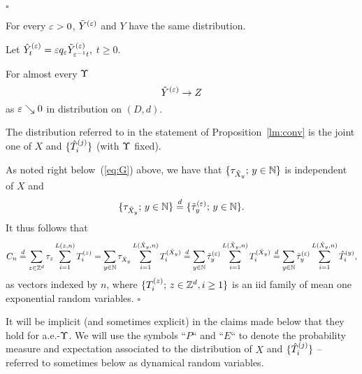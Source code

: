 $\square$

\begin{prop}
\label{prop:version}
For every $\varepsilon>0$, $\tilde Y^{(\varepsilon)}$ and $Y$ have the same distribution.
\end{prop}

Let $\hat Y^{(\varepsilon)}_t=\varepsilon q_\varepsilon\tilde Y^{(\varepsilon)}_{\varepsilon^{-1}t},$ $t\geq0$.

\begin{prop}
\label{lm:conv}
For almost every $\Upsilon$
\begin{equation}
\label{eq:conve}
\hat Y^{(\eps)}\to Z
\end{equation}
as $\varepsilon\searrow0$ in distribution on $(D,d)$.
\end{prop}


\begin{rmk}
 \label{rmk:aeups}
The distribution referred to in the statement of Proposition~\ref{lm:conv} is the joint one of $X$ and $\{\hat T^{(j)}_i\}$ (with $\Upsilon$ fixed).
\end{rmk}




As noted right below~(\ref{eq:G}) above, we have that $\{\tau_{\hat X_y};\,y\in{\mathbb N}\}$ is independent of $X$ and
\begin{equation}
\label{eq:seq}
\{\tau_{\hat X_y};\,y\in\N\}\stackrel{d}=\{\tilde\tau^{(\eps)}_{y};\,y\in\N\}.
\end{equation}
It thus follows that
\begin{equation}
\label{eq:clock1}
C_n\stackrel{d}=\sum_{z\in\Z^d}\tau_{z}\sum_{i=1}^{L(z,n)} T^{(z)}_i
=\sum_{y\in\N}\tau_{\hat X_y}\sum_{i=1}^{L(\hat X_y,n)} T^{(\hat X_y)}_i
\stackrel{d}=\sum_{y\in\N}\tilde\tau^{(\eps)}_{y}\sum_{i=1}^{L(\hat X_y,n)} T^{(\hat X_y)}_i
\stackrel{d}=\sum_{y\in\N}\tilde\tau^{(\eps)}_{y}\sum_{i=1}^{L(\hat X_y,n)}\hat T^{(y)}_i,
\end{equation}
as vectors indexed by $n$, where $\{T^{(z)}_i;\,z\in{\mathbb Z}^d, i\geq1\}$ is an iid family of mean one 
exponential random variables.
$\square$

\bigskip







It will be implicit (and sometimes explicit) in the claims made below that they hold for a.e.-$\Upsilon$.
We will use the symbols ``$P$`` and ``$E$`` to denote the probability measure and expectation associated to the
distribution of $X$ and $\{\hat T^{(j)}_i\}$ -- referred to sometimes below as dynamical random variables.

